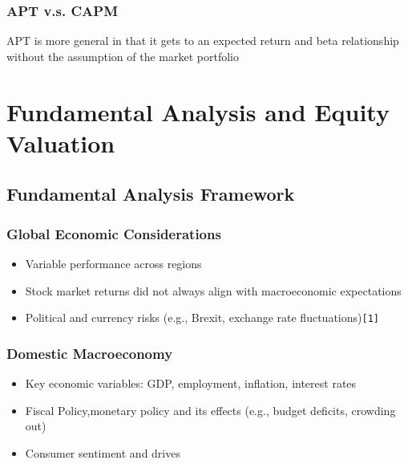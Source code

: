 \documentclass[
]{book}
\providecommand{\tightlist}{%
  \setlength{\itemsep}{0pt}\setlength{\parskip}{0pt}}
\begin{document}
\hypertarget{apt-v.s.-capm}{%
\subsection{APT v.s. CAPM}\label{apt-v.s.-capm}}

APT is more general in that it gets to an expected return and beta relationship without the assumption of the market portfolio

\hypertarget{ch5}{%
\chapter{Fundamental Analysis and Equity Valuation}\label{ch5}}

\hypertarget{fundamental-analysis-framework}{%
\section{Fundamental Analysis Framework}\label{fundamental-analysis-framework}}

\hypertarget{global-economic-considerations}{%
\subsection{Global Economic Considerations}\label{global-economic-considerations}}

\begin{itemize}
\tightlist
\item
  Variable performance across regions
\item
  Stock market returns did not always align with macroeconomic expectations
\item
  Political and currency risks (e.g., Brexit, exchange rate fluctuations)\texttt{{[}1{]}}
\end{itemize}

\hypertarget{domestic-macroeconomy}{%
\subsection{Domestic Macroeconomy}\label{domestic-macroeconomy}}

\begin{itemize}
\tightlist
\item
  Key economic variables: GDP, employment, inflation, interest rates
\item
  Fiscal Policy,monetary policy and its effects (e.g., budget deficits, crowding out)
\item
  Consumer sentiment and drives
\end{itemize}
\end{document}
